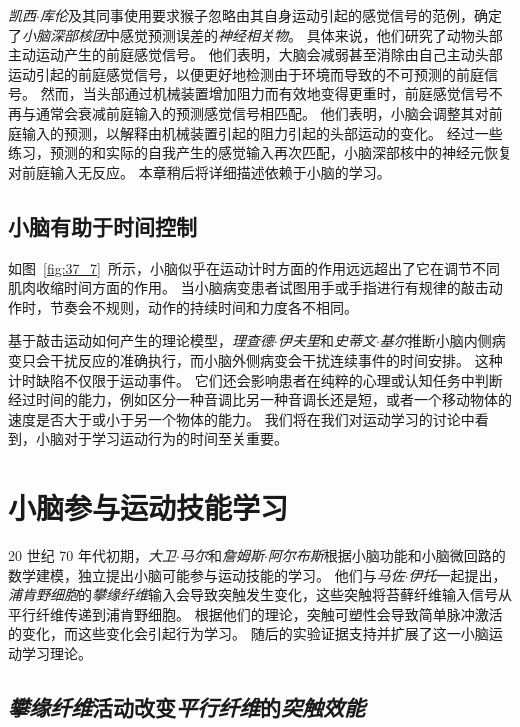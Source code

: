 \textit{凯西$\cdot$库伦}及其同事使用要求猴子忽略由其自身运动引起的感觉信号的范例，确定了\textit{小脑深部核团}中感觉预测误差的\textit{神经相关物}。
具体来说，他们研究了动物头部主动运动产生的前庭感觉信号。
他们表明，大脑会减弱甚至消除由自己主动头部运动引起的前庭感觉信号，以便更好地检测由于环境而导致的不可预测的前庭信号。
然而，当头部通过机械装置增加阻力而有效地变得更重时，前庭感觉信号不再与通常会衰减前庭输入的预测感觉信号相匹配。
他们表明，小脑会调整其对前庭输入的预测，以解释由机械装置引起的阻力引起的头部运动的变化。
经过一些练习，预测的和实际的自我产生的感觉输入再次匹配，小脑深部核中的神经元恢复对前庭输入无反应。
本章稍后将详细描述依赖于小脑的学习。



\subsection{小脑有助于时间控制}

如图~\ref{fig:37_7}~所示，小脑似乎在运动计时方面的作用远远超出了它在调节不同肌肉收缩时间方面的作用。
当小脑病变患者试图用手或手指进行有规律的敲击动作时，节奏会不规则，动作的持续时间和力度各不相同。


基于敲击运动如何产生的理论模型，\textit{理查德$\cdot$伊夫里}和\textit{史蒂文$\cdot$基尔}推断小脑内侧病变只会干扰反应的准确执行，而小脑外侧病变会干扰连续事件的时间安排。
这种计时缺陷不仅限于运动事件。
它们还会影响患者在纯粹的心理或认知任务中判断经过时间的能力，例如区分一种音调比另一种音调长还是短，或者一个移动物体的速度是否大于或小于另一个物体的能力。
我们将在我们对运动学习的讨论中看到，小脑对于学习运动行为的时间至关重要。



\section{小脑参与运动技能学习}

20 世纪 70 年代初期，\textit{大卫$\cdot$马尔}和\textit{詹姆斯$\cdot$阿尔布斯}根据小脑功能和小脑微回路的数学建模，独立提出小脑可能参与运动技能的学习。
他们与\textit{马佐$\cdot$伊托}一起提出，\textit{浦肯野细胞}的\textit{攀缘纤维}输入会导致突触发生变化，这些突触将苔藓纤维输入信号从平行纤维传递到浦肯野细胞。
根据他们的理论，突触可塑性会导致简单脉冲激活的变化，而这些变化会引起行为学习。
随后的实验证据支持并扩展了这一小脑运动学习理论。



\subsection{\textit{攀缘纤维}活动改变\textit{平行纤维}的\textit{突触效能}}

